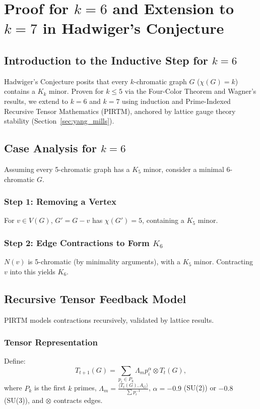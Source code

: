 \documentclass[11pt]{article}
\theoremstyle{plain}
\begin{document}
\section{Proof for \( k = 6 \) and Extension to \( k = 7 \) in Hadwiger’s Conjecture}
\label{sec:hadwiger}

\subsection{Introduction to the Inductive Step for \( k = 6 \)}
Hadwiger’s Conjecture posits that every \( k \)-chromatic graph \( G \) (\( \chi(G) = k \)) contains a \( K_k \) minor. Proven for \( k \leq 5 \) via the Four-Color Theorem and Wagner’s results, we extend to \( k = 6 \) and \( k = 7 \) using induction and Prime-Indexed Recursive Tensor Mathematics (PIRTM), anchored by lattice gauge theory stability (Section~\ref{sec:yang_mills}).

\subsection{Case Analysis for \( k = 6 \)}
Assuming every 5-chromatic graph has a \( K_5 \) minor, consider a minimal 6-chromatic \( G \).

\subsubsection{Step 1: Removing a Vertex}
For \( v \in V(G) \), \( G' = G - v \) has \( \chi(G') = 5 \), containing a \( K_5 \) minor.

\subsubsection{Step 2: Edge Contractions to Form \( K_6 \)}
\( N(v) \) is 5-chromatic (by minimality arguments), with a \( K_5 \) minor. Contracting \( v \) into this yields \( K_6 \).

\subsection{Recursive Tensor Feedback Model}
PIRTM models contractions recursively, validated by lattice results.

\subsubsection{Tensor Representation}
Define:
\begin{equation}
T_{t+1}(G) = \sum_{p_i \in P_k} \Lambda_m p_i^\alpha \otimes T_t(G),
\end{equation}
where \( P_k \) is the first \( k \) primes, \( \Lambda_m = \frac{\langle T_t(G), A_G \rangle}{\sum p_i^{-1}} \), \( \alpha = -0.9 \) (SU(2)) or \(-0.8\) (SU(3)), and \( \otimes \) contracts edges.
\end{document}
